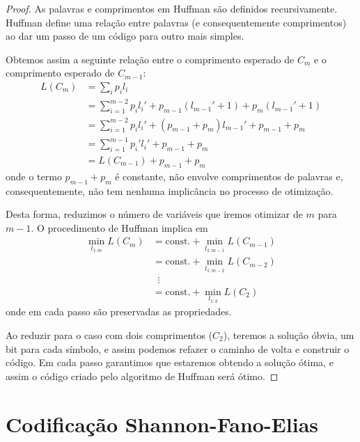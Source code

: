 \begin{proof}
As palavras e comprimentos em Huffman são definidos recursivamente. Huffman define uma relação entre palavras
(e consequentemente comprimentos) ao dar um passo de um código para outro mais simples.

Obtemos assim a seguinte relação entre o comprimento esperado de $C_m$ e o comprimento esperado de $C_{m-1}$:
\begin{subequations}
  \begin{align}
    L(C_m) &= \sum_i p_i l_i\\
           &= \sum_{i=1}^{m-2} p_i l_i' + p_{m-1} (l_{m-1}' + 1) + p_m (l_{m-1}' + 1) \\
           &= \sum_{i=1}^{m-2} p_i l_i' + (p_{m-1} + p_m) l_{m-1}' + p_{m-1} + p_m \\
           &= \sum_{i=1}^{m-1} p_i' l_i'+ p_{m-1} + p_m \\
           &= L(C_{m-1}) + p_{m-1} + p_m
  \end{align}
\end{subequations} 
onde o termo $p_{m-1} + p_m$ é constante, não envolve comprimentos de palavras e, consequentemente,
não tem nenhuma implicância no processo de otimização.

Desta forma, reduzimos o número de variáveis que iremos otimizar de $m$ para $m-1$.
O procedimento de Huffman implica em 
\begin{subequations}
  \begin{align}
    \min_{l_{1:m}} L(C_m) &= \text{const.} + \min_{l_{1:m-1}} L(C_{m-1}) \\
                          &= \text{const.} + \min_{l_{1:m-2}} L(C_{m-2}) \\
                          & \;\; \vdots \nonumber \\
                          &= \text{const.} + \min_{l_{1:2}} L(C_{2})
  \end{align}
\end{subequations}
onde em cada passo são preservadas as propriedades.

Ao reduzir para o caso com dois comprimentos ($C_2$), teremos a solução óbvia, um bit para cada símbolo, e assim 
podemos refazer o caminho de volta e construir o código.
Em cada passo garantimos que estaremos obtendo a solução ótima, e assim o código criado pelo algoritmo de Huffman
será ótimo.
\end{proof}





\section{Codificação Shannon-Fano-Elias}

